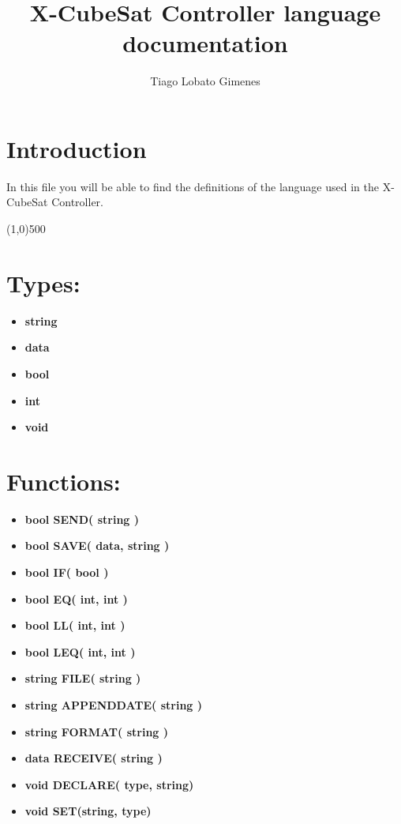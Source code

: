 \documentclass[11pt,a4paper]{article}
\author{Tiago Lobato Gimenes}
\title{X-CubeSat Controller language documentation}
\begin{document}
\maketitle

\section*{Introduction}
In this file you will be able to find the definitions of the language used in the X-CubeSat Controller.

\begin{center}
\line(1,0){500}
\end{center}

\section*{Types:}
\begin{itemize}
\item \textbf{string}
\item \textbf{data}
\item \textbf{bool}
\item \textbf{int}
\item \textbf{void}
\end{itemize}

\section*{Functions:}
\begin{itemize}
\item \textbf{bool SEND( string )}
\item \textbf{bool SAVE( data, string )}
\item \textbf{bool IF( bool )}
\item \textbf{bool EQ( int, int )}
\item \textbf{bool LL( int, int )}
\item \textbf{bool LEQ( int, int )}
\item \textbf{string FILE( string )}
\item \textbf{string APPENDDATE( string )}
\item \textbf{string FORMAT( string )}
\item \textbf{data RECEIVE( string )}
\item \textbf{void DECLARE( type, string)}
\item \textbf{void SET(string, type)}
\end{itemize}
\end{document}
